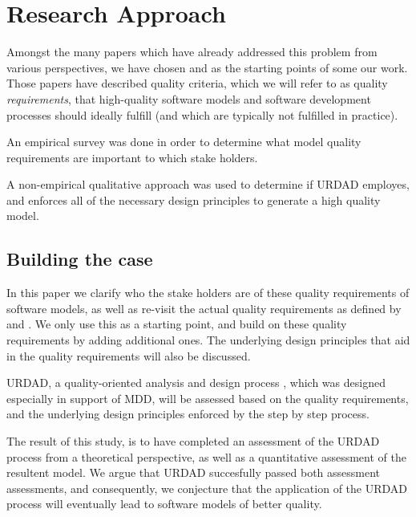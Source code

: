 
\section{Research Approach}
\label{sec:researchApproach}
Amongst the many papers which have already addressed this problem from various perspectives, we have
 chosen \cite{lange_2006:improvingTheQualityOfUmlModelsInPractice} and \cite{mohagheghi_2007:evaluatingQualityInModelDrivenEngineering} as the  starting points of some our work. Those papers have described quality criteria, which we will refer to as quality \emph{requirements}, that high-quality software models and software development processes should ideally fulfill (and which are typically not fulfilled in practice).

An empirical survey was done in order to determine what model quality requirements are important to which stake holders.
 
A non-empirical qualitative approach was used to determine if URDAD employes, and enforces all of the necessary design principles to generate a high quality model. 


\subsection{Building the case}
In this paper we clarify who the stake holders are of these quality requirements  of software models, as well as re-visit the actual quality requirements as defined by \cite{lange_2006:improvingTheQualityOfUmlModelsInPractice} and \cite{mohagheghi_2007:evaluatingQualityInModelDrivenEngineering}. We only use this as a starting point, and build on these quality requirements by adding additional ones. The underlying design principles that aid in the quality requirements will also be discussed.

URDAD, a quality-oriented analysis and design process \cite{solms_2009:generatingMdasPimUsingUrdad}, which was designed especially in support of MDD, will be assessed based on the quality requirements, and the underlying design principles enforced by the step by step process.

The result of this study, is to have completed an assessment of the URDAD process from a theoretical perspective, as well as a quantitative assessment of the resultent model. We argue that URDAD succesfully passed both assessment assessments, and consequently, we conjecture that the application of the URDAD process will eventually lead to software models of better quality.


